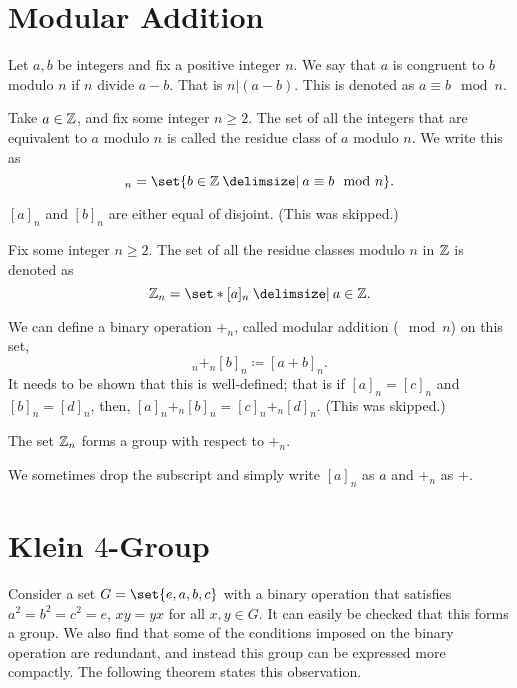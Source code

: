 \documentclass[11pt]{penrose}
\newcommand{\keyword}[1]{\textsf{#1}}
\begin{document}
\section{Modular Addition}

\begin{ndfn}
    Let $a, b$ be integers and fix a positive integer $n$. We say that $a$ is congruent to $b$ modulo $n$ if $n$ divide $a-b$. That is $n | (a-b)$. This is denoted as $a \equiv b \mod n$.
\end{ndfn}

\begin{ndfn}
    Take $a \in \mathbb{Z}$, and fix some integer $n \geq 2$. The set of all the integers that are equivalent to $a$ modulo $n$ is called the \keyword{residue class} of $a$ modulo $n$. We write this as
    \begin{equation*}
        [a]_n = \set{b \in \Z \st a \equiv b \mod n}.
    \end{equation*}
\end{ndfn}

\begin{remark}
    $[a]_n$ and $[b]_n$ are either equal of disjoint. (This was skipped.)
\end{remark}

\begin{ndfn}
    Fix some integer $n \geq 2$. The set of all the residue classes modulo $n$ in $\mathbb{Z}$ is denoted as
    \begin{equation*}
        \Z_n = \set*{[a]_n \st a \in \Z}.
    \end{equation*}
\end{ndfn}

We can define a binary operation $+_n$, called \keyword{modular addition} ($\mod n$) on this set,
\begin{equation*}
    [a]_n +_n [b]_n \coloneq [a + b]_n.
\end{equation*}
It needs to be shown that this is well-defined; that is if $[a]_n = [c]_n$ and $[b]_n = [d]_n$, then, $[a]_n +_n [b]_n = [c]_n +_n [d]_n$. (This was skipped.)

\begin{nthm}
    The set $\mathbb{Z}_n$ forms a group with respect to $+_n$.
\end{nthm}

We sometimes drop the subscript and simply write $[a]_n$ as $a$ and $+_n$ as $+$.

\section{\texorpdfstring{Klein $4$-Group}{Klein 4 Group}}
Consider a set $G = \set{e, a, b, c}$ with a binary operation that satisfies $a^2 = b^2 = c^2 = e$, $xy = yx$ for all $x, y \in G$. It can easily be checked that this forms a group. We also find that some of the conditions imposed on the binary operation are redundant, and instead this group can be expressed more compactly. The following theorem states this observation.
\end{document}
